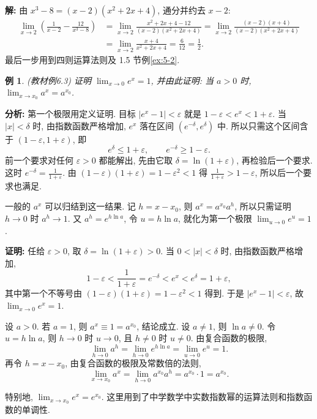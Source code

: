 \documentclass[UTF8,openany]{ctexbook}
\theoremstyle{chinesetextbook}
\newtheorem{example}{例}[section]
\newenvironment{cnproof}{\par\indent\textbf{证明:} \ignorespaces}{\par}
\newenvironment{cnsolution}{\par\indent\textbf{解:} \ignorespaces}{\par}
\begin{document}
\begin{cnsolution}
由 $x^3-8=(x-2)(x^2+2x+4)$, 通分并约去 $x-2$:
\[
\begin{aligned}
\lim_{x\to2}\left(\frac1{x-2}-\frac{12}{x^3-8}\right)
&=\lim_{x\to2}\frac{x^2+2x+4-12}{(x-2)(x^2+2x+4)}=\lim_{x\to2}\frac{(x-2)(x+4)}{(x-2)(x^2+2x+4)}\\
&=\lim_{x\to2}\frac{x+4}{x^2+2x+4}=\frac6{12}=\frac12.
\end{aligned}
\]
最后一步用到四则运算法则及 1.5 节例\ref{ex:5-2}.
\end{cnsolution}
\begin{example}\label{ex:6-3}
\textnormal{(教材例6.3)} 证明 $\displaystyle\lim_{x\to0}e^x=1$, 并由此证明: 当 $a>0$ 时, $\displaystyle\lim_{x\to x_0}a^x=a^{x_0}$.
\end{example}
\par\indent\textbf{分析:} 第一个极限用定义证明. 目标 $|e^x-1|<\varepsilon$ 就是 $1-\varepsilon<e^x<1+\varepsilon$. 当 $|x|<\delta$ 时, 由指数函数严格增加, $e^x$ 落在区间 $(e^{-\delta},e^\delta)$ 中. 所以只需这个区间含于 $(1-\varepsilon,1+\varepsilon)$, 即
\[
e^\delta\le1+\varepsilon,\qquad e^{-\delta}\ge1-\varepsilon.
\]
前一个要求对任何 $\varepsilon>0$ 都能解出, 先由它取 $\delta=\ln(1+\varepsilon)$, 再检验后一个要求. 这时 $\displaystyle e^{-\delta}=\frac1{1+\varepsilon}$. 由 $(1-\varepsilon)(1+\varepsilon)=1-\varepsilon^2<1$ 得 $\displaystyle\frac1{1+\varepsilon}>1-\varepsilon$, 所以后一个要求也满足.

一般的 $a^x$ 可以归结到这一结果. 记 $h=x-x_0$, 则 $a^x=a^{x_0}a^h$, 所以只需证明 $h\to0$ 时 $a^h\to1$. 又 $a^h=e^{h\ln a}$, 令 $u=h\ln a$, 就化为第一个极限 $\displaystyle\lim_{u\to0}e^u=1$.
\begin{cnproof}
任给 $\varepsilon>0$, 取 $\delta=\ln(1+\varepsilon)>0$. 当 $0<|x|<\delta$ 时, 由指数函数严格增加,
\[
1-\varepsilon<\frac1{1+\varepsilon}=e^{-\delta}<e^x<e^\delta=1+\varepsilon,
\]
其中第一个不等号由 $(1-\varepsilon)(1+\varepsilon)=1-\varepsilon^2<1$ 得到. 于是 $|e^x-1|<\varepsilon$, 故 $\displaystyle\lim_{x\to0}e^x=1$.

设 $a>0$. 若 $a=1$, 则 $a^x\equiv1=a^{x_0}$, 结论成立. 设 $a\ne1$, 则 $\ln a\ne0$. 令 $u=h\ln a$, 则 $h\to0$ 时 $u\to0$, 且 $h\ne0$ 时 $u\ne0$. 由复合函数的极限,
\[
\lim_{h\to0}a^h=\lim_{h\to0}e^{h\ln a}=\lim_{u\to0}e^u=1.
\]
再令 $h=x-x_0$, 由复合函数的极限及常数倍的法则,
\[
\lim_{x\to x_0}a^x=\lim_{h\to0}a^{x_0}a^h=a^{x_0}\cdot1=a^{x_0}.
\]
\end{cnproof}
特别地, $\displaystyle\lim_{x\to x_0}e^x=e^{x_0}$. 这里用到了中学数学中实数指数幂的运算法则和指数函数的单调性.
\end{document}
